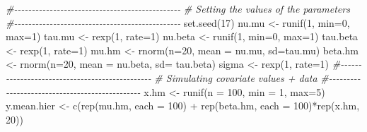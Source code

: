 \documentclass[
]{article}
\newenvironment{Shaded}{\begin{snugshade}}{\end{snugshade}}
\newcommand{\AttributeTok}[1]{\textcolor[rgb]{0.77,0.63,0.00}{#1}}
\newcommand{\CommentTok}[1]{\textcolor[rgb]{0.56,0.35,0.01}{\textit{#1}}}
\newcommand{\DecValTok}[1]{\textcolor[rgb]{0.00,0.00,0.81}{#1}}
\newcommand{\FunctionTok}[1]{\textcolor[rgb]{0.00,0.00,0.00}{#1}}
\newcommand{\NormalTok}[1]{#1}
\newcommand{\OtherTok}[1]{\textcolor[rgb]{0.56,0.35,0.01}{#1}}
\newcommand{\SpecialCharTok}[1]{\textcolor[rgb]{0.00,0.00,0.00}{#1}}
\begin{document}
\begin{Shaded}
\begin{Highlighting}[]
\CommentTok{\#{-}{-}{-}{-}{-}{-}{-}{-}{-}{-}{-}{-}{-}{-}{-}{-}{-}{-}{-}{-}{-}{-}{-}{-}{-}{-}{-}{-}{-}{-}{-}{-}{-}{-}{-}{-}{-}{-}{-}{-}{-}{-}{-}{-}{-}{-}{-}}
\CommentTok{\# Setting the values of the parameters}
\CommentTok{\#{-}{-}{-}{-}{-}{-}{-}{-}{-}{-}{-}{-}{-}{-}{-}{-}{-}{-}{-}{-}{-}{-}{-}{-}{-}{-}{-}{-}{-}{-}{-}{-}{-}{-}{-}{-}{-}{-}{-}{-}{-}{-}{-}{-}{-}{-}{-}}
\FunctionTok{set.seed}\NormalTok{(}\DecValTok{17}\NormalTok{)}
\NormalTok{nu.mu }\OtherTok{\textless{}{-}} \FunctionTok{runif}\NormalTok{(}\DecValTok{1}\NormalTok{, }\AttributeTok{min=}\DecValTok{0}\NormalTok{, }\AttributeTok{max=}\DecValTok{1}\NormalTok{)}
\NormalTok{tau.mu }\OtherTok{\textless{}{-}} \FunctionTok{rexp}\NormalTok{(}\DecValTok{1}\NormalTok{, }\AttributeTok{rate=}\DecValTok{1}\NormalTok{)}
\NormalTok{nu.beta }\OtherTok{\textless{}{-}} \FunctionTok{runif}\NormalTok{(}\DecValTok{1}\NormalTok{, }\AttributeTok{min=}\DecValTok{0}\NormalTok{, }\AttributeTok{max=}\DecValTok{1}\NormalTok{)}
\NormalTok{tau.beta }\OtherTok{\textless{}{-}} \FunctionTok{rexp}\NormalTok{(}\DecValTok{1}\NormalTok{, }\AttributeTok{rate=}\DecValTok{1}\NormalTok{)}
\NormalTok{mu.hm }\OtherTok{\textless{}{-}} \FunctionTok{rnorm}\NormalTok{(}\AttributeTok{n=}\DecValTok{20}\NormalTok{, }\AttributeTok{mean =}\NormalTok{ nu.mu, }\AttributeTok{sd=}\NormalTok{tau.mu)}
\NormalTok{beta.hm }\OtherTok{\textless{}{-}} \FunctionTok{rnorm}\NormalTok{(}\AttributeTok{n=}\DecValTok{20}\NormalTok{, }\AttributeTok{mean =}\NormalTok{ nu.beta, }\AttributeTok{sd=}\NormalTok{ tau.beta)}
\NormalTok{sigma }\OtherTok{\textless{}{-}} \FunctionTok{rexp}\NormalTok{(}\DecValTok{1}\NormalTok{, }\AttributeTok{rate=}\DecValTok{1}\NormalTok{)}
\CommentTok{\#{-}{-}{-}{-}{-}{-}{-}{-}{-}{-}{-}{-}{-}{-}{-}{-}{-}{-}{-}{-}{-}{-}{-}{-}{-}{-}{-}{-}{-}{-}{-}{-}{-}{-}{-}{-}{-}{-}{-}{-}{-}{-}{-}{-}{-}{-}{-}}
\CommentTok{\# Simulating covariate values + data}
\CommentTok{\#{-}{-}{-}{-}{-}{-}{-}{-}{-}{-}{-}{-}{-}{-}{-}{-}{-}{-}{-}{-}{-}{-}{-}{-}{-}{-}{-}{-}{-}{-}{-}{-}{-}{-}{-}{-}{-}{-}{-}{-}{-}{-}{-}{-}{-}{-}{-}}
\NormalTok{x.hm }\OtherTok{\textless{}{-}} \FunctionTok{runif}\NormalTok{(}\AttributeTok{n =} \DecValTok{100}\NormalTok{, }\AttributeTok{min =} \DecValTok{1}\NormalTok{, }\AttributeTok{max=}\DecValTok{5}\NormalTok{)}
\NormalTok{y.mean.hier }\OtherTok{\textless{}{-}} \FunctionTok{c}\NormalTok{(}\FunctionTok{rep}\NormalTok{(mu.hm, }\AttributeTok{each =} \DecValTok{100}\NormalTok{) }\SpecialCharTok{+} 
                   \FunctionTok{rep}\NormalTok{(beta.hm, }\AttributeTok{each =} \DecValTok{100}\NormalTok{)}\SpecialCharTok{*}\FunctionTok{rep}\NormalTok{(x.hm, }\DecValTok{20}\NormalTok{))}


\end{Highlighting}
\end{Shaded}
\end{document}
